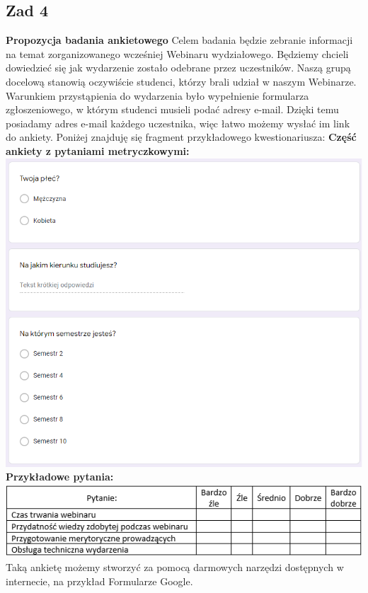 \documentclass[12pt]{mwart}\usepackage[]{graphicx}\usepackage[]{color}
\makeatletter
\def\maxwidth{ %
  \ifdim\Gin@nat@width>\linewidth
    \linewidth
  \else
    \Gin@nat@width
  \fi
}
\newenvironment{knitrout}{}{} %
\makeatother
\begin{document}
\subsection*{Zad 4}
\textbf{Propozycja badania ankietowego} \newline
Celem badania będzie zebranie informacji na temat zorganizowanego wcześniej Webinaru wydziałowego. Będziemy chcieli dowiedzieć się jak wydarzenie zostało odebrane przez uczestników. Naszą grupą docelową stanowią oczywiście studenci, którzy brali udział w naszym Webinarze. Warunkiem przystąpienia do wydarzenia było wypełnienie formularza zgłoszeniowego, w którym studenci musieli podać adresy e-mail. Dzięki temu posiadamy adres e-mail każdego uczestnika, więc łatwo możemy wysłać im link do ankiety. Poniżej znajduję się fragment przykładowego kwestionariusza: \newline\newline
\textbf{Część ankiety z pytaniami metryczkowymi:} \newline
\begin{knitrout}
\color{fgcolor}
\includegraphics[width=\maxwidth]{ankieta1} 
\end{knitrout}
\newline
\textbf{Przykładowe pytania:}\newline
\begin{knitrout}
\color{fgcolor}
\includegraphics[width=\maxwidth]{ankieta2} 
\end{knitrout}
\newline
Taką ankietę możemy stworzyć za pomocą darmowych narzędzi dostępnych w internecie, na przykład Formularze Google.
\newline
\newline
\newline
\end{document}
